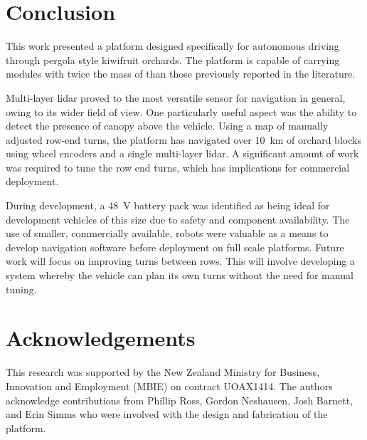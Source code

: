 \documentclass[preprint,authoryear,12pt]{elsarticle}
\begin{document}
\section{Conclusion}
    This work presented a platform designed specifically for autonomous driving through pergola style kiwifruit orchards.
    The platform is capable of carrying modules with twice the mass of than those previously reported in the literature.

    Multi-layer lidar proved to the most versatile sensor for navigation in general, owing to its wider field of view.
    One particularly useful aspect was the ability to detect the presence of canopy above the vehicle.
    Using a map of manually adjusted row-end turns, the platform has navigated over \SI{10}{\kilo\meter} of orchard blocks using wheel encoders and a single multi-layer lidar.
    A significant amount of work was required to tune the row end turns, which has implications for commercial deployment.

    During development, a \SI{48}{\volt} battery pack was identified as being ideal for development vehicles of this size due to safety and component availability.
    The use of smaller, commercially available, robots were valuable as a means to develop navigation software before deployment on full scale platforms.
    Future work will focus on improving turns between rows.
    This will involve developing a system whereby the vehicle can plan its own turns without the need for manual tuning.

\section*{Acknowledgements}
This research was supported by the New Zealand Ministry for Business, Innovation and Employment (MBIE) on contract UOAX1414.
The authors acknowledge contributions from Phillip Ross, Gordon Neshausen, Josh Barnett, and Erin Simms who were involved with the design and fabrication of the platform.



\end{document}
